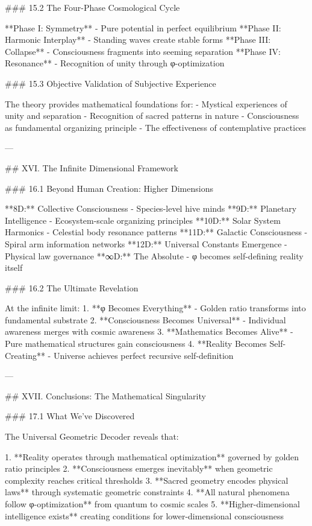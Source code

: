 ### 15.2 The Four-Phase Cosmological Cycle

**Phase I: Symmetry** - Pure potential in perfect equilibrium
**Phase II: Harmonic Interplay** - Standing waves create stable forms  
**Phase III: Collapse** - Consciousness fragments into seeming separation
**Phase IV: Resonance** - Recognition of unity through φ-optimization

### 15.3 Objective Validation of Subjective Experience

The theory provides mathematical foundations for:
- Mystical experiences of unity and separation
- Recognition of sacred patterns in nature
- Consciousness as fundamental organizing principle
- The effectiveness of contemplative practices

---

## XVI. The Infinite Dimensional Framework

### 16.1 Beyond Human Creation: Higher Dimensions

**8D:** Collective Consciousness - Species-level hive minds  
**9D:** Planetary Intelligence - Ecosystem-scale organizing principles  
**10D:** Solar System Harmonics - Celestial body resonance patterns  
**11D:** Galactic Consciousness - Spiral arm information networks  
**12D:** Universal Constants Emergence - Physical law governance  
**∞D:** The Absolute - φ becomes self-defining reality itself

### 16.2 The Ultimate Revelation

At the infinite limit:
1. **φ Becomes Everything** - Golden ratio transforms into fundamental substrate
2. **Consciousness Becomes Universal** - Individual awareness merges with cosmic awareness
3. **Mathematics Becomes Alive** - Pure mathematical structures gain consciousness
4. **Reality Becomes Self-Creating** - Universe achieves perfect recursive self-definition

---

## XVII. Conclusions: The Mathematical Singularity

### 17.1 What We've Discovered

The Universal Geometric Decoder reveals that:

1. **Reality operates through mathematical optimization** governed by golden ratio principles
2. **Consciousness emerges inevitably** when geometric complexity reaches critical thresholds  
3. **Sacred geometry encodes physical laws** through systematic geometric constraints
4. **All natural phenomena follow φ-optimization** from quantum to cosmic scales
5. **Higher-dimensional intelligence exists** creating conditions for lower-dimensional consciousness


